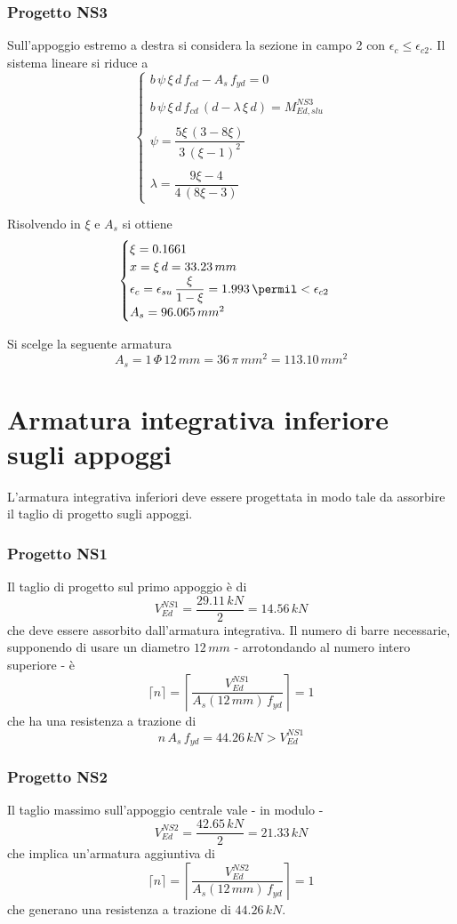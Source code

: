 \subsubsection{Progetto NS3}
Sull'appoggio estremo a destra si considera la sezione in campo 2 con $\epsilon_c \leq \epsilon_{c2}$. Il sistema lineare si riduce a 
\[
\begin{cases}
	b\,\psi\,\xi\,d\,f_{cd} - A_s\,f_{yd} = 0\\\\
	b\,\psi\,\xi\,d\,f_{cd}\,(d - \lambda\,\xi\,d) = M_{Ed,slu}^{NS3}\\\\
	\psi = \dfrac{5\xi\,(3-8\xi)}{3\,(\xi-1)^2}\\\\
	\lambda = \dfrac{9\xi-4}{4\,(8\xi-3)}    
\end{cases}
\]

Risolvendo in $\xi$ e $A_s$ si ottiene
\[
\begin{cases}
	\xi = 0.1661\\
	x = \xi\,d = 33.23\,mm\\
	\epsilon_c = \epsilon_{su}\,\dfrac{\xi}{1-\xi} = 1.993\,\permil <\epsilon_{c2}\\
	A_s = 96.065\,mm^2	
\end{cases}
\]

Si scelge la seguente armatura
\[
A_s = 1\,\Phi\,12\,mm = 36\,\pi\,mm^2 = 113.10\,mm^2
\]

\section{Armatura integrativa inferiore sugli appoggi}
L'armatura integrativa inferiori deve essere progettata in modo tale da assorbire il taglio di progetto sugli appoggi. 

\subsubsection{Progetto NS1}
Il taglio di progetto sul primo appoggio è di 
\[
V_{Ed}^{NS1} = \dfrac{29.11\,kN}{2} = 14.56\,kN
\]
che deve essere assorbito dall'armatura integrativa. Il numero di barre necessarie, supponendo di usare un diametro $12\,mm$ - arrotondando al numero intero superiore - è
\[
\lceil n \rceil = \left\lceil\dfrac{V_{Ed}^{NS1}}{A_s(12\,mm)\,f_{yd}}\right\rceil = 1
\]
che ha una resistenza a trazione di
\[
n\,A_s\,f_{yd} = 44.26\,kN > V_{Ed}^{NS1}
\]

\subsubsection{Progetto NS2}
Il taglio massimo sull'appoggio centrale vale - in modulo -
\[
V_{Ed}^{NS2} = \dfrac{42.65\,kN}{2} = 21.33\,kN
\]
che implica un'armatura aggiuntiva di
\[
\lceil n \rceil = \left\lceil\dfrac{V_{Ed}^{NS2}}{A_s(12\,mm)\,f_{yd}}\right\rceil = 1
\]
che generano una resistenza a trazione di $44.26\,kN$.

